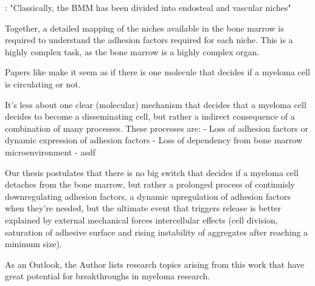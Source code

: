 \citet{bouzerdanAdhesionMoleculesMultiple2022}: "Classically, the BMM has been
divided into endosteal and vascular niches"

Together, a detailed mapping of the niches available in the bone marrow is required
to understand the adhesion factors required for each niche. This is a highly
complex task, as the bone marrow is a highly complex organ.




Papers like \citet{akhmetzyanovaDynamicCD138Surface2020} make it seem as if
there is one molecule that decides if a myeloma cell is circulating or not.

It's less about one clear (molecular) mechanism that decides that a myeloma cell
decides to become a disseminating cell, but rather a indirect consequence of a combination of many
processes.
These processes are:
- Loss of adhesion factors or dynamic expression of adhesion factors
- Loss of dependency from bone marrow microenvironment
- asdf

Our thesis postulates that there is no big switch that decides if a myeloma cell
detaches from the bone marrow, but rather a prolonged process of continuisly
downregulating adhesion factors, a dynamic upregulation of adhesion factors when
they're needed, but the ultimate event that triggers release is better
explained by external mechanical forces intercellular effects (cell division,
saturation of adhesive surface and rising instability of aggregates after
reaching a minimum size).






\label{sec:discussion_potential_breakthroughs}
As an Outlook, the Author lists research topics arising from this work that have
great potential for breakthroughs in myeloma research.

